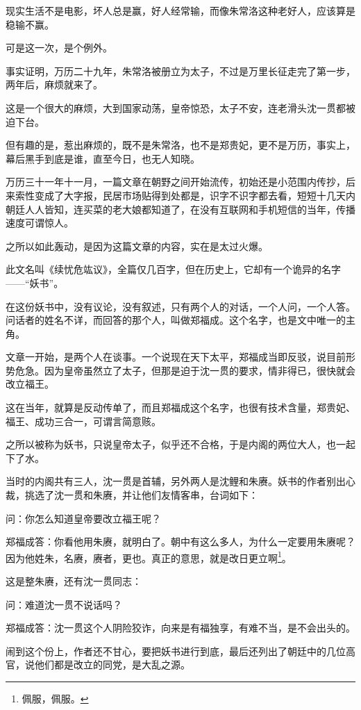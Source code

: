 \begin{multicols}{\theparacolNo}
		现实生活不是电影，坏人总是赢，好人经常输，而像朱常洛这种老好人，应该算是稳输不赢。

		可是这一次，是个例外。

		事实证明，万历二十九年，朱常洛被册立为太子，不过是万里长征走完了第一步，两年后，麻烦就来了。

		这是一个很大的麻烦，大到国家动荡，皇帝惊恐，太子不安，连老滑头沈一贯都被迫下台。

		但有趣的是，惹出麻烦的，既不是朱常洛，也不是郑贵妃，更不是万历，事实上，幕后黑手到底是谁，直至今日，也无人知晓。

		万历三十一年十一月，一篇文章在朝野之间开始流传，初始还是小范围内传抄，后来索性变成了大字报，民居市场贴得到处都是，识字不识字都去看，短短十几天内朝廷人人皆知，连买菜的老大娘都知道了，在没有互联网和手机短信的当年，传播速度可谓惊人。

		之所以如此轰动，是因为这篇文章的内容，实在是太过火爆。

		此文名叫《续忧危竑议》，全篇仅几百字，但在历史上，它却有一个诡异的名字——“妖书”。

		在这份妖书中，没有议论，没有叙述，只有两个人的对话，一个人问，一个人答。问话者的姓名不详，而回答的那个人，叫做郑福成。这个名字，也是文中唯一的主角。

		文章一开始，是两个人在谈事。一个说现在天下太平，郑福成当即反驳，说目前形势危急。因为皇帝虽然立了太子，但那是迫于沈一贯的要求，情非得已，很快就会改立福王。

		这在当年，就算是反动传单了，而且郑福成这个名字，也很有技术含量，郑贵妃、福王、成功三合一，可谓言简意赅。

		之所以被称为妖书，只说皇帝太子，似乎还不合格，于是内阁的两位大人，也一起下了水。

		当时的内阁共有三人，沈一贯是首辅，另外两人是沈鲤和朱赓。妖书的作者别出心裁，挑选了沈一贯和朱赓，并让他们友情客串，台词如下：

		问：你怎么知道皇帝要改立福王呢？

		郑福成答：你看他用朱赓，就明白了。朝中有这么多人，为什么一定要用朱赓呢？因为他姓朱，名赓，赓者，更也。真正的意思，就是改日更立啊\footnote{佩服，佩服。}。

		这是整朱赓，还有沈一贯同志：

		问：难道沈一贯不说话吗？

		郑福成答：沈一贯这个人阴险狡诈，向来是有福独享，有难不当，是不会出头的。

		闹到这个份上，作者还不甘心，要把妖书进行到底，最后还列出了朝廷中的几位高官，说他们都是改立的同党，是大乱之源。


\end{multicols}
